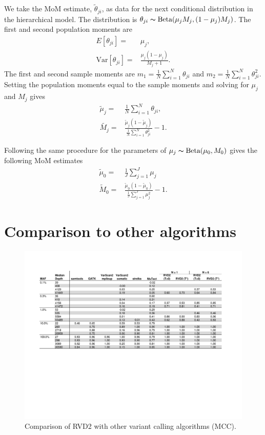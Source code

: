 \documentclass[11pt,reqno]{amsart}
\begin{document}
We take the MoM estimate, $\tilde{\theta}_{ji}$, as data for the next conditional distribution in the hierarchical model. The distribution is $\theta_{ji} \thicksim \text{Beta}(\mu_jM_j, (1-\mu_j)M_j)$. The first and second population moments are
\begin{eqnarray}
	E[\theta_{ji}] =& \mu_j,\\
	\text{Var}[\theta_{ji}] =& \frac{\mu_j(1-\mu_j)} { M_j + 1 }.
\end{eqnarray}
The first and second sample moments are $m_1 = \frac{1}{N}\sum_{i=1}^N \theta_{ji}$ and $m_2 = \frac{1}{N}\sum_{i=1}^N \theta_{ji}^2$. Setting the population moments equal to the sample moments and solving for $\mu_j$ and $M_j$ gives
\begin{eqnarray}
	\tilde{\mu}_j =& \frac{1}{N} \sum_{i=1}^N \theta_{ji}, \\
	\tilde{M_j} =& \frac{ \tilde{\mu}_j (1 - \tilde{\mu}_j ) } { \frac{1}{N} \sum_{i=1}^N \theta_{ji}^2 } -1.
\end{eqnarray}

Following the same procedure for the parameters of $\mu_j \thicksim \text{Beta}(\mu_0, M_0)$ gives the following MoM estimates
\begin{eqnarray}
	\tilde{\mu}_0 =& \frac{1}{J} \sum_{j=1}^J \mu_j \\
	\tilde{M}_0 =& \frac{ \tilde{\mu}_0 (1 - \tilde{\mu}_0 ) } {\frac{1}{J} \sum_{j=1}^J \mu_j^2 } -1.
\end{eqnarray}

\section{Comparison to other algorithms}\label{sec:comparison}
\begin{figure}[h]
\begin{center}
\includegraphics[width=140mm]{pdf_figs/comparison_table_mcc.pdf}
\caption{Comparison of RVD2 with other variant calling algorithms (MCC).}
\label{fig:comparison_mcc}
\end{center}
\end{figure}




\end{document}

